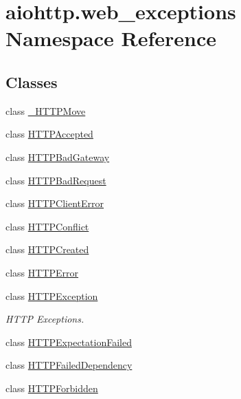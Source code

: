 \hypertarget{namespaceaiohttp_1_1web__exceptions}{}\section{aiohttp.\+web\+\_\+exceptions Namespace Reference}
\label{namespaceaiohttp_1_1web__exceptions}
\subsection*{Classes}
\begin{DoxyCompactItemize}
\item 
class \hyperlink{classaiohttp_1_1web__exceptions_1_1___h_t_t_p_move}{\+\_\+\+H\+T\+T\+P\+Move}
\item 
class \hyperlink{classaiohttp_1_1web__exceptions_1_1_h_t_t_p_accepted}{H\+T\+T\+P\+Accepted}
\item 
class \hyperlink{classaiohttp_1_1web__exceptions_1_1_h_t_t_p_bad_gateway}{H\+T\+T\+P\+Bad\+Gateway}
\item 
class \hyperlink{classaiohttp_1_1web__exceptions_1_1_h_t_t_p_bad_request}{H\+T\+T\+P\+Bad\+Request}
\item 
class \hyperlink{classaiohttp_1_1web__exceptions_1_1_h_t_t_p_client_error}{H\+T\+T\+P\+Client\+Error}
\item 
class \hyperlink{classaiohttp_1_1web__exceptions_1_1_h_t_t_p_conflict}{H\+T\+T\+P\+Conflict}
\item 
class \hyperlink{classaiohttp_1_1web__exceptions_1_1_h_t_t_p_created}{H\+T\+T\+P\+Created}
\item 
class \hyperlink{classaiohttp_1_1web__exceptions_1_1_h_t_t_p_error}{H\+T\+T\+P\+Error}
\item 
class \hyperlink{classaiohttp_1_1web__exceptions_1_1_h_t_t_p_exception}{H\+T\+T\+P\+Exception}
\begin{DoxyCompactList}\small\item\em H\+T\+TP Exceptions. \end{DoxyCompactList}\item 
class \hyperlink{classaiohttp_1_1web__exceptions_1_1_h_t_t_p_expectation_failed}{H\+T\+T\+P\+Expectation\+Failed}
\item 
class \hyperlink{classaiohttp_1_1web__exceptions_1_1_h_t_t_p_failed_dependency}{H\+T\+T\+P\+Failed\+Dependency}
\item 
class \hyperlink{classaiohttp_1_1web__exceptions_1_1_h_t_t_p_forbidden}{H\+T\+T\+P\+Forbidden}
\item 

\end{DoxyCompactItemize}
